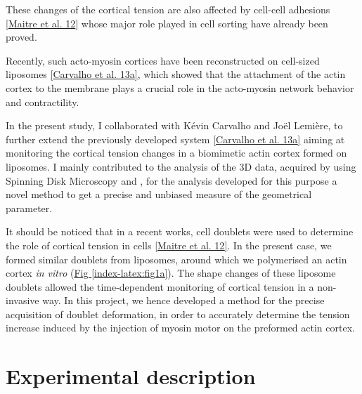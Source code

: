 \documentclass[A4paperpaper,11pt,english]{sphinxmanual}
\begin{document}
These changes of the cortical tension are also affected by cell-cell
adhesions {\hyperref[index-latex:maitre2012]{{[}Maitre et al. 12{]}}} whose major role played in cell sorting have already been proved.

Recently, such acto-myosin cortices have been reconstructed on cell-sized
liposomes {\hyperref[index-latex:carvalho2013a]{{[}Carvalho et al. 13a{]}}}, which showed that the attachment of the actin
cortex to the membrane plays a crucial role in the acto-myosin network behavior and contractility.

In the present study, I collaborated with Kévin Carvalho and Joël Lemière, to
further extend the previously developed system {\hyperref[index-latex:carvalho2013a]{{[}Carvalho et al. 13a{]}}}
aiming at monitoring the cortical tension changes in a biomimetic actin cortex formed
on liposomes. I mainly contributed to the analysis of the 3D data, acquired by using Spinning Disk Microscopy and , for the analysis developed for this purpose a
novel method to get a precise and unbiased measure of the geometrical
parameter.

It should be noticed that in a recent works, cell doublets were used to determine the role of cortical tension in cells {\hyperref[index-latex:maitre2012]{{[}Maitre et al. 12{]}}}. In the present case, we formed similar doublets from liposomes,
around which we polymerised an actin cortex \emph{in vitro} (\hyperref[index-latex:fig1a]{Fig  \ref*{index-latex:fig1a}}). The
shape changes of these liposome doublets allowed the time-dependent monitoring of
cortical tension in a non-invasive way.  In this project, we hence developed a
method for the precise acquisition of doublet deformation, in order to accurately determine
the tension increase induced by the injection of myosin motor on
the preformed actin cortex.


\section{Experimental description}
\label{index-latex:experimental-description}
\end{document}
